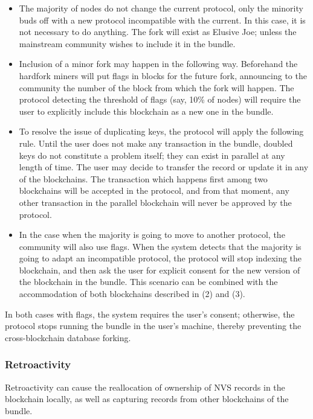 \begin{multicols}{2}
\begin{itemize}
\item[(1)] The majority of nodes do not change the current protocol, only the minority buds off with a new protocol incompatible with the current. In this case, it is not necessary to do anything. The fork will exist as Elusive Joe; unless the mainstream community wishes to include it in the bundle.
\item[(2)] Inclusion of a minor fork may happen in the following way. Beforehand the hardfork miners will put flags in blocks for the future fork, announcing to the community the number of the block from which the fork will happen. The protocol detecting the threshold of flags (say, 10\% of nodes) will require the user to explicitly include this blockchain as a new one in the bundle.
\item[(3)] To resolve the issue of duplicating keys, the protocol will apply the following rule. Until the user does not make any transaction in the bundle, doubled keys do not constitute a problem itself; they can exist in parallel at any length of time. The user may decide to transfer the record or update it in any of the blockchains. The transaction which happens first among two blockchains will be accepted in the protocol, and from that moment, any other transaction in the parallel blockchain will never be approved by the protocol.
\item[(4)] In the case when the majority is going to move to another protocol, the community will also use flags. When the system detects that the majority is going to adapt an incompatible protocol, the protocol will stop indexing the blockchain, and then ask the user for explicit consent for the new version of the blockchain in the bundle. This scenario can be combined with the accommodation of both blockchains described in (2) and (3).
\end{itemize}

In both cases with flags, the system requires the user’s consent; otherwise, the protocol stops running the bundle in the user’s machine, thereby preventing the cross-blockchain database forking.

\subsubsection{Retroactivity}\label{subsubsec-4.3.5}

Retroactivity can cause the reallocation of ownership of NVS records in the blockchain locally, as well as capturing records from other blockchains of the bundle.


\end{multicols}
